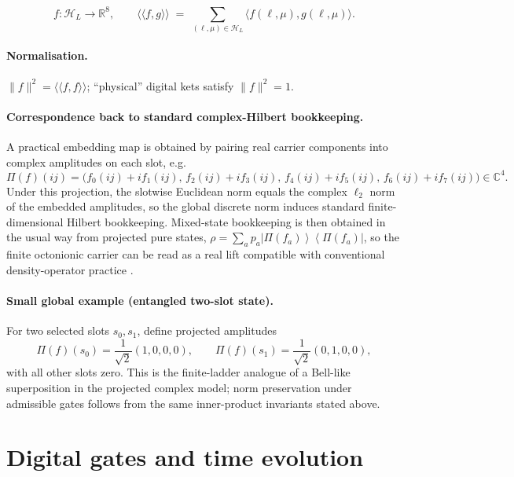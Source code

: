 \documentclass[11pt,a4paper]{article}
\theoremstyle{remark}
\begin{document}
\begin{equation}
  f:\mathcal{H}_L \to \mathbb{R}^8,
  \qquad
  \langle\!\langle f,g\rangle\!\rangle \;=\; \sum_{(\ell,\mu)\in\mathcal{H}_L} \langle f(\ell,\mu),g(\ell,\mu)\rangle.
\end{equation}

\paragraph{Normalisation.}
$\|f\|^2=\langle\!\langle f,f\rangle\!\rangle$; ``physical'' digital kets satisfy $\|f\|^2=1$.

\paragraph{Correspondence back to standard complex-Hilbert bookkeeping.}
A practical embedding map is obtained by pairing real carrier components into complex amplitudes on each slot, e.g.
\[
  \Pi(f)(ij) = \bigl(f_0(ij)+i f_1(ij),\, f_2(ij)+i f_3(ij),\, f_4(ij)+i f_5(ij),\, f_6(ij)+i f_7(ij)\bigr)\in\mathbb{C}^4.
\]
Under this projection, the slotwise Euclidean norm equals the complex $\ell_2$ norm of the embedded amplitudes, so the global discrete norm induces standard finite-dimensional Hilbert bookkeeping. Mixed-state bookkeeping is then obtained in the usual way from projected pure states, $\rho=\sum_a p_a \left|\Pi(f_a)\right\rangle\!\left\langle\Pi(f_a)\right|$, so the finite octonionic carrier can be read as a real lift compatible with conventional density-operator practice \cite{vonNeumann1955,dirac1930}.

\paragraph{Small global example (entangled two-slot state).}
For two selected slots $s_0,s_1$, define projected amplitudes
\[
  \Pi(f)(s_0)=\frac{1}{\sqrt{2}}(1,0,0,0),\qquad
  \Pi(f)(s_1)=\frac{1}{\sqrt{2}}(0,1,0,0),
\]
with all other slots zero. This is the finite-ladder analogue of a Bell-like superposition in the projected complex model; norm preservation under admissible gates follows from the same inner-product invariants stated above.

\section{Digital gates and time evolution}
\label{sec:gates}
\end{document}
